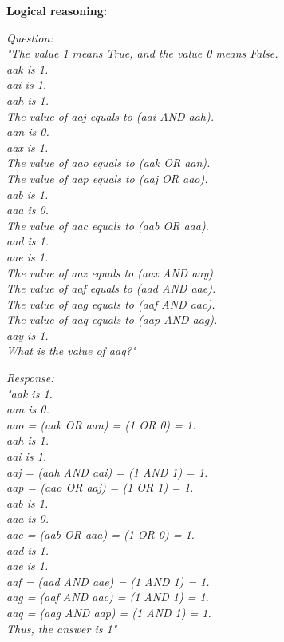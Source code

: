 \textbf{Logical reasoning:}

\begin{tcolorbox}[colback=yellow!2!white, colframe=black, boxrule=0.5pt]
\small
\textit{Question: \\ "The value 1 means True, and the value 0 means False.\\ aak is 1.\\ aai is 1.\\ aah is 1.\\ The value of aaj equals to (aai AND aah).\\ aan is 0.\\ aax is 1.\\ The value of aao equals to (aak OR aan).\\ The value of aap equals to (aaj OR aao).\\ aab is 1.\\ aaa is 0.\\ The value of aac equals to (aab OR aaa).\\ aad is 1.\\ aae is 1.\\ The value of aaz equals to (aax AND aay).\\ The value of aaf equals to (aad AND aae).\\ The value of aag equals to (aaf AND aac).\\ The value of aaq equals to (aap AND aag).\\ aay is 1.\\ What is the value of aaq?"}
\end{tcolorbox}

\begin{tcolorbox}[colback=yellow!2!white, colframe=black, boxrule=0.5pt]
\small
\textit{Response: \\ "aak is 1.\\ aan is 0.\\ aao = (aak OR aan) = (1 OR 0) = 1.\\ aah is 1.\\ aai is 1.\\ aaj = (aah AND aai) = (1 AND 1) = 1.\\ aap = (aao OR aaj) = (1 OR 1) = 1.\\ aab is 1.\\ aaa is 0.\\ aac = (aab OR aaa) = (1 OR 0) = 1.\\ aad is 1.\\ aae is 1.\\ aaf = (aad AND aae) = (1 AND 1) = 1.\\ aag = (aaf AND aac) = (1 AND 1) = 1.\\ aaq = (aag AND aap) = (1 AND 1) = 1.\\ Thus, the answer is 1"}
\end{tcolorbox}

